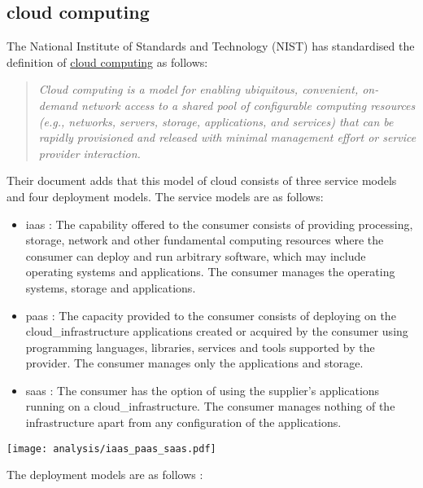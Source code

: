 \subsection{\texorpdfstring{\Gls{cloud}}{} computing}
\label{subsec:cloudcomputing}
The National Institute of Standards and Technology (NIST) \cite{nist_definition_cloud_computing} has standardised the definition of \hyperref[subsec:cloudcomputing]{cloud computing} as follows:
\begin{quote}
    \textit{Cloud computing is a model for enabling ubiquitous, convenient, on-demand network access to a shared pool of configurable computing resources (e.g., networks, servers, storage, applications, and services) that can be rapidly provisioned and released with minimal management effort or service provider interaction. \cite{nist_definition_cloud_computing}}
\end{quote}
Their document \cite{nist_definition_cloud_computing} adds that this model of \gls{cloud} consists of three service models and four deployment models. The service models are as follows:
\begin{itemize}
    \item \acrfull{iaas} : The capability offered to the consumer consists of providing processing, storage, network and other fundamental computing resources where the consumer can deploy and run arbitrary software, which may include operating systems and applications. The consumer manages the operating systems, storage and applications.
    \item \acrfull{paas} : The capacity provided to the consumer consists of deploying on the \gls{cloud_infrastructure} applications created or acquired by the consumer using programming languages, libraries, services and tools supported by the provider. The consumer manages only the applications and storage.
    \item \acrfull{saas} : The consumer has the option of using the supplier's applications running on a \gls{cloud_infrastructure}. The consumer manages nothing of the infrastructure apart from any configuration of the applications.
\end{itemize}
\begin{center}
    \begingroup
    \texttt{[image: analysis/iaas\_paas\_saas.pdf]}
    \label{fig:iaas_paas_saas}
    \endgroup
\end{center}
The deployment models are as follows \cite{nist_definition_cloud_computing} :
